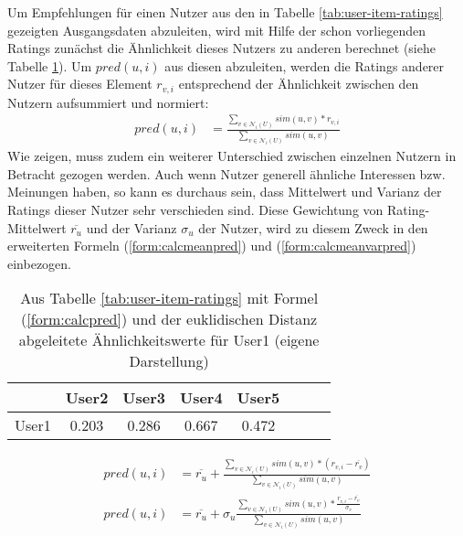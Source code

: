 Um Empfehlungen für einen Nutzer aus den in Tabelle \ref{tab:user-item-ratings} gezeigten Ausgangsdaten abzuleiten, wird mit Hilfe der schon vorliegenden Ratings zunächst die Ähnlichkeit dieses Nutzers zu anderen berechnet (siehe Tabelle \ref{tab:user-user-sim}). Um $pred(u,i)$ aus diesen abzuleiten, werden die Ratings anderer Nutzer für dieses Element $r_{v,i}$ entsprechend der Ähnlichkeit zwischen den Nutzern aufsummiert und normiert:
\begin{align}
pred(u,i) & = \frac{ \sum_{v \in \mathcal{N}_i(U)} sim(u, v)*r_{v,i}}{ \sum_{v \in \mathcal{N}_i(U)} sim(u,v) } \label{form:calcpred}
\end{align}
Wie \citep{Herlocker:2002:EAD:593967.594047} zeigen, muss zudem ein weiterer Unterschied zwischen einzelnen Nutzern in Betracht gezogen werden. Auch wenn Nutzer generell ähnliche Interessen bzw. Meinungen haben, so kann es durchaus sein, dass Mittelwert und Varianz der Ratings dieser Nutzer sehr verschieden sind. Diese Gewichtung von Rating-Mittelwert $\overline{r_u}$ und der Varianz  $\sigma_u$ der Nutzer, wird zu diesem Zweck in den erweiterten Formeln (\ref{form:calcmeanpred}) und (\ref{form:calcmeanvarpred}) einbezogen. \citep{hb_04,Huete:2012:UPA:2206442.2206675}
\begin{table}[ht]
  \centering
\begin{minipage}[b]{4in}
  \begin{tabular}{ | l || c | c | c | c | c | c | c | }
    \hline
           & User2 & User3 & User4 & User5 \\ \hline
User1 &    0.203 &	0.286 &	0.667 & 0.472 \\
    \hline
  \end{tabular}
  \caption{\footnotesize Aus Tabelle \ref{tab:user-item-ratings} mit Formel (\ref{form:calcpred}) und der euklidischen Distanz abgeleitete Ähnlichkeitswerte für User1 { \scriptsize (eigene Darstellung)}}
  \label{tab:user-user-sim}
\end{minipage}
\end{table}
\begin{align}
pred(u, i) & = \overline{r_u} + \frac{ \sum_{v \in \mathcal{N}_i(U)} sim(u, v)*(r_{v,i}-\overline{r_v}) } { \sum_{v \in \mathcal{N}_i(U)} sim(u,v) } \label{form:calcmeanpred} \\
pred(u, i) & = \overline{r_u} + \sigma_u \frac{ \sum_{v \in \mathcal{N}_i(U)} sim(u, v)*\frac{r_{v,i}-\overline{r_v}}{\sigma_v} } { \sum_{v \in \mathcal{N}_i(U)} sim(u,v) } \label{form:calcmeanvarpred}
\end{align}

